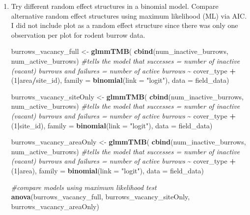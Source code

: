 \documentclass[
]{article}
\newenvironment{Shaded}{\begin{snugshade}}{\end{snugshade}}
\newcommand{\AttributeTok}[1]{\textcolor[rgb]{0.13,0.29,0.53}{#1}}
\newcommand{\CommentTok}[1]{\textcolor[rgb]{0.56,0.35,0.01}{\textit{#1}}}
\newcommand{\DecValTok}[1]{\textcolor[rgb]{0.00,0.00,0.81}{#1}}
\newcommand{\FunctionTok}[1]{\textcolor[rgb]{0.13,0.29,0.53}{\textbf{#1}}}
\newcommand{\NormalTok}[1]{#1}
\newcommand{\OtherTok}[1]{\textcolor[rgb]{0.56,0.35,0.01}{#1}}
\newcommand{\SpecialCharTok}[1]{\textcolor[rgb]{0.81,0.36,0.00}{\textbf{#1}}}
\newcommand{\StringTok}[1]{\textcolor[rgb]{0.31,0.60,0.02}{#1}}
\begin{document}
\begin{enumerate}
\def\labelenumi{\arabic{enumi})}
\item
  Try different random effect structures in a binomial model. Compare
  alternative random effect structures using maximum likelihood (ML) via
  AIC. I did not include plot as a random effect structure since there
  was only one observation per plot for rodent burrow data.

\begin{Shaded}
\begin{Highlighting}[]
\NormalTok{burrows\_vacancy\_full }\OtherTok{\textless{}{-}} \FunctionTok{glmmTMB}\NormalTok{(}
  \FunctionTok{cbind}\NormalTok{(num\_inactive\_burrows, num\_active\_burrows) }\CommentTok{\#tells the model that successes = number of inactive (vacant) burrows and failures = number of active burrows}
  \SpecialCharTok{\textasciitilde{}}\NormalTok{ cover\_type }\SpecialCharTok{+}\NormalTok{ (}\DecValTok{1}\SpecialCharTok{|}\NormalTok{area}\SpecialCharTok{/}\NormalTok{site\_id),}
  \AttributeTok{family =} \FunctionTok{binomial}\NormalTok{(}\AttributeTok{link =} \StringTok{"logit"}\NormalTok{), }
  \AttributeTok{data =}\NormalTok{ field\_data)}

\NormalTok{burrows\_vacancy\_siteOnly }\OtherTok{\textless{}{-}} \FunctionTok{glmmTMB}\NormalTok{(}
  \FunctionTok{cbind}\NormalTok{(num\_inactive\_burrows, num\_active\_burrows) }\CommentTok{\#tells the model that successes = number of inactive (vacant) burrows and failures = number of active burrows}
  \SpecialCharTok{\textasciitilde{}}\NormalTok{ cover\_type }\SpecialCharTok{+}\NormalTok{ (}\DecValTok{1}\SpecialCharTok{|}\NormalTok{site\_id),}
  \AttributeTok{family =} \FunctionTok{binomial}\NormalTok{(}\AttributeTok{link =} \StringTok{"logit"}\NormalTok{), }
  \AttributeTok{data =}\NormalTok{ field\_data)}

\NormalTok{burrows\_vacancy\_areaOnly }\OtherTok{\textless{}{-}} \FunctionTok{glmmTMB}\NormalTok{(}
  \FunctionTok{cbind}\NormalTok{(num\_inactive\_burrows, num\_active\_burrows) }\CommentTok{\#tells the model that successes = number of inactive (vacant) burrows and failures = number of active burrows}
  \SpecialCharTok{\textasciitilde{}}\NormalTok{ cover\_type }\SpecialCharTok{+}\NormalTok{ (}\DecValTok{1}\SpecialCharTok{|}\NormalTok{area),}
  \AttributeTok{family =} \FunctionTok{binomial}\NormalTok{(}\AttributeTok{link =} \StringTok{"logit"}\NormalTok{), }
  \AttributeTok{data =}\NormalTok{ field\_data)}


\CommentTok{\#compare models using maximum likelihood test}
\FunctionTok{anova}\NormalTok{(burrows\_vacancy\_full, burrows\_vacancy\_siteOnly, burrows\_vacancy\_areaOnly)}
\end{Highlighting}
\end{Shaded}


\end{enumerate}
\end{document}
